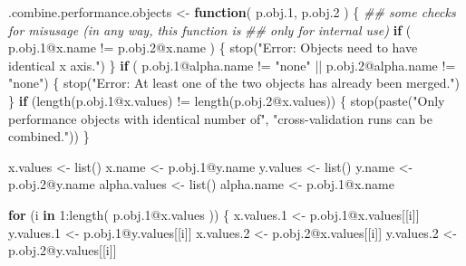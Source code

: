 \documentclass[
  letterpaper,
  DIV=11,
  numbers=noendperiod]{scrartcl}
\newenvironment{Shaded}{\begin{snugshade}}{\end{snugshade}}
\newcommand{\ControlFlowTok}[1]{\textcolor[rgb]{0.00,0.23,0.31}{\textbf{#1}}}
\newcommand{\DecValTok}[1]{\textcolor[rgb]{0.68,0.00,0.00}{#1}}
\newcommand{\DocumentationTok}[1]{\textcolor[rgb]{0.37,0.37,0.37}{\textit{#1}}}
\newcommand{\FloatTok}[1]{\textcolor[rgb]{0.68,0.00,0.00}{#1}}
\newcommand{\FunctionTok}[1]{\textcolor[rgb]{0.28,0.35,0.67}{#1}}
\newcommand{\NormalTok}[1]{\textcolor[rgb]{0.00,0.23,0.31}{#1}}
\newcommand{\OtherTok}[1]{\textcolor[rgb]{0.00,0.23,0.31}{#1}}
\newcommand{\SpecialCharTok}[1]{\textcolor[rgb]{0.37,0.37,0.37}{#1}}
\newcommand{\StringTok}[1]{\textcolor[rgb]{0.13,0.47,0.30}{#1}}
\begin{document}
\begin{Shaded}
\begin{Highlighting}[]
\NormalTok{.combine.performance.objects }\OtherTok{\textless{}{-}} \ControlFlowTok{function}\NormalTok{( p.obj}\FloatTok{.1}\NormalTok{, p.obj}\FloatTok{.2}\NormalTok{ ) \{}
    \DocumentationTok{\#\# some checks for misusage (in any way, this function is}
    \DocumentationTok{\#\# only for internal use)}
    \ControlFlowTok{if}\NormalTok{ ( p.obj}\FloatTok{.1}\SpecialCharTok{@}\NormalTok{x.name }\SpecialCharTok{!=}\NormalTok{ p.obj}\FloatTok{.2}\SpecialCharTok{@}\NormalTok{x.name ) \{}
        \FunctionTok{stop}\NormalTok{(}\StringTok{"Error: Objects need to have identical x axis."}\NormalTok{)}
\NormalTok{    \}}
    \ControlFlowTok{if}\NormalTok{ ( p.obj}\FloatTok{.1}\SpecialCharTok{@}\NormalTok{alpha.name }\SpecialCharTok{!=} \StringTok{"none"} \SpecialCharTok{||}\NormalTok{ p.obj}\FloatTok{.2}\SpecialCharTok{@}\NormalTok{alpha.name }\SpecialCharTok{!=} \StringTok{"none"}\NormalTok{) \{}
        \FunctionTok{stop}\NormalTok{(}\StringTok{"Error: At least one of the two objects has already been merged."}\NormalTok{)}
\NormalTok{    \}}
    \ControlFlowTok{if}\NormalTok{ (}\FunctionTok{length}\NormalTok{(p.obj}\FloatTok{.1}\SpecialCharTok{@}\NormalTok{x.values) }\SpecialCharTok{!=} \FunctionTok{length}\NormalTok{(p.obj}\FloatTok{.2}\SpecialCharTok{@}\NormalTok{x.values)) \{}
        \FunctionTok{stop}\NormalTok{(}\FunctionTok{paste}\NormalTok{(}\StringTok{"Only performance objects with identical number of"}\NormalTok{,}
                   \StringTok{"cross{-}validation runs can be combined."}\NormalTok{))}
\NormalTok{    \}}

\NormalTok{    x.values }\OtherTok{\textless{}{-}} \FunctionTok{list}\NormalTok{()}
\NormalTok{    x.name }\OtherTok{\textless{}{-}}\NormalTok{ p.obj}\FloatTok{.1}\SpecialCharTok{@}\NormalTok{y.name}
\NormalTok{    y.values }\OtherTok{\textless{}{-}} \FunctionTok{list}\NormalTok{()}
\NormalTok{    y.name }\OtherTok{\textless{}{-}}\NormalTok{ p.obj}\FloatTok{.2}\SpecialCharTok{@}\NormalTok{y.name}
\NormalTok{    alpha.values }\OtherTok{\textless{}{-}} \FunctionTok{list}\NormalTok{()}
\NormalTok{    alpha.name }\OtherTok{\textless{}{-}}\NormalTok{ p.obj}\FloatTok{.1}\SpecialCharTok{@}\NormalTok{x.name}

    \ControlFlowTok{for}\NormalTok{ (i }\ControlFlowTok{in} \DecValTok{1}\SpecialCharTok{:}\FunctionTok{length}\NormalTok{( p.obj}\FloatTok{.1}\SpecialCharTok{@}\NormalTok{x.values )) \{}
\NormalTok{        x.values}\FloatTok{.1} \OtherTok{\textless{}{-}}\NormalTok{ p.obj}\FloatTok{.1}\SpecialCharTok{@}\NormalTok{x.values[[i]]}
\NormalTok{        y.values}\FloatTok{.1} \OtherTok{\textless{}{-}}\NormalTok{ p.obj}\FloatTok{.1}\SpecialCharTok{@}\NormalTok{y.values[[i]]}
\NormalTok{        x.values}\FloatTok{.2} \OtherTok{\textless{}{-}}\NormalTok{ p.obj}\FloatTok{.2}\SpecialCharTok{@}\NormalTok{x.values[[i]]}
\NormalTok{        y.values}\FloatTok{.2} \OtherTok{\textless{}{-}}\NormalTok{ p.obj}\FloatTok{.2}\SpecialCharTok{@}\NormalTok{y.values[[i]]}


\end{Highlighting}
\end{Shaded}
\end{document}
